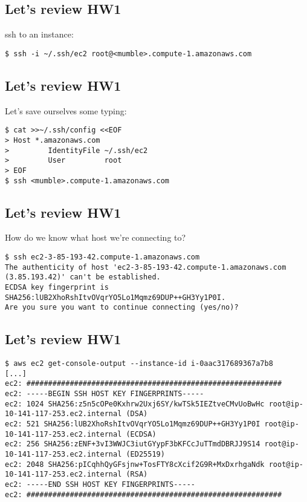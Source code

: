 \documentclass[xga]{xdvislides}
\begin{document}
\subsection{Let's review HW1}
\vspace{.5in}

ssh to an instance:
\begin{verbatim}
$ ssh -i ~/.ssh/ec2 root@<mumble>.compute-1.amazonaws.com
\end{verbatim}

\subsection{Let's review HW1}
\vspace{.5in}

Let's save ourselves some typing:
\begin{verbatim}
$ cat >>~/.ssh/config <<EOF
> Host *.amazonaws.com
>         IdentityFile ~/.ssh/ec2
>         User         root
> EOF
$ ssh <mumble>.compute-1.amazonaws.com
\end{verbatim}

\subsection{Let's review HW1}
\vspace{.5in}

How do we know what host we're connecting to?
\begin{verbatim}
$ ssh ec2-3-85-193-42.compute-1.amazonaws.com
The authenticity of host 'ec2-3-85-193-42.compute-1.amazonaws.com
(3.85.193.42)' can't be established.
ECDSA key fingerprint is SHA256:lUB2XhoRshItvOVqrYO5Lo1Mqmz69DUP++GH3Yy1P0I.
Are you sure you want to continue connecting (yes/no)? 
\end{verbatim}

\subsection{Let's review HW1}
\begin{verbatim}
$ aws ec2 get-console-output --instance-id i-0aac317689367a7b8
[...]
ec2: ###########################################################
ec2: -----BEGIN SSH HOST KEY FINGERPRINTS-----
ec2: 1024 SHA256:z5n5cOPe0Kxhrw2Uxj6SY/kwTSk5IEZtveCMvUoBwHc root@ip-10-141-117-253.ec2.internal (DSA)
ec2: 521 SHA256:lUB2XhoRshItvOVqrYO5Lo1Mqmz69DUP++GH3Yy1P0I root@ip-10-141-117-253.ec2.internal (ECDSA)
ec2: 256 SHA256:zENF+3vI3WWJC3iutGYypF3bKFCcJuTTmdDBRJJ9S14 root@ip-10-141-117-253.ec2.internal (ED25519)
ec2: 2048 SHA256:pICqhhQyGFsjnw+TosFTY8cXcif2G9R+MxDxrhgaNdk root@ip-10-141-117-253.ec2.internal (RSA)
ec2: -----END SSH HOST KEY FINGERPRINTS-----
ec2: ###########################################################
\end{verbatim}
\end{document}

